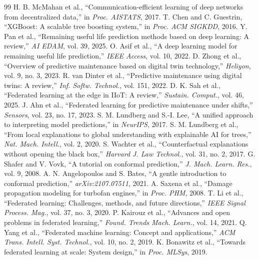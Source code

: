 \documentclass[letterpaper, 10 pt, conference]{ieeeconf}
\begin{document}
\begin{thebibliography}{99}
 H. B. McMahan et al., ``Communication-efficient learning of deep networks from decentralized data,'' in \emph{Proc. AISTATS}, 2017.
 T. Chen and C. Guestrin, ``XGBoost: A scalable tree boosting system,'' in \emph{Proc. ACM SIGKDD}, 2016.
 Y. Pan et al., ``Remaining useful life prediction methods based on deep learning: A review,'' \emph{AI EDAM}, vol. 39, 2025.
 O. Asif et al., ``A deep learning model for remaining useful life prediction,'' \emph{IEEE Access}, vol. 10, 2022.
 D. Zhong et al., ``Overview of predictive maintenance based on digital twin technology,'' \emph{Heliyon}, vol. 9, no. 3, 2023.
 R. van Dinter et al., ``Predictive maintenance using digital twins: A review,'' \emph{Inf. Softw. Technol.}, vol. 151, 2022.
 D. K. Sah et al., ``Federated learning at the edge in IIoT: A review,'' \emph{Sustain. Comput.}, vol. 46, 2025.
 J. Ahn et al., ``Federated learning for predictive maintenance under shifts,'' \emph{Sensors}, vol. 23, no. 17, 2023.
 S. M. Lundberg and S.-I. Lee, ``A unified approach to interpreting model predictions,'' in \emph{NeurIPS}, 2017.
 S. M. Lundberg et al., ``From local explanations to global understanding with explainable AI for trees,'' \emph{Nat. Mach. Intell.}, vol. 2, 2020.
 S. Wachter et al., ``Counterfactual explanations without opening the black box,'' \emph{Harvard J. Law Technol.}, vol. 31, no. 2, 2017.
 G. Shafer and V. Vovk, ``A tutorial on conformal prediction,'' \emph{J. Mach. Learn. Res.}, vol. 9, 2008.
 A. N. Angelopoulos and S. Bates, ``A gentle introduction to conformal prediction,'' \emph{arXiv:2107.07511}, 2021.
 A. Saxena et al., ``Damage propagation modeling for turbofan engines,'' in \emph{Proc. PHM}, 2008.
 T. Li et al., ``Federated learning: Challenges, methods, and future directions,'' \emph{IEEE Signal Process. Mag.}, vol. 37, no. 3, 2020.
 P. Kairouz et al., ``Advances and open problems in federated learning,'' \emph{Found. Trends Mach. Learn.}, vol. 14, 2021.
 Q. Yang et al., ``Federated machine learning: Concept and applications,'' \emph{ACM Trans. Intell. Syst. Technol.}, vol. 10, no. 2, 2019.
 K. Bonawitz et al., ``Towards federated learning at scale: System design,'' in \emph{Proc. MLSys}, 2019.

\end{thebibliography}
\end{document}
